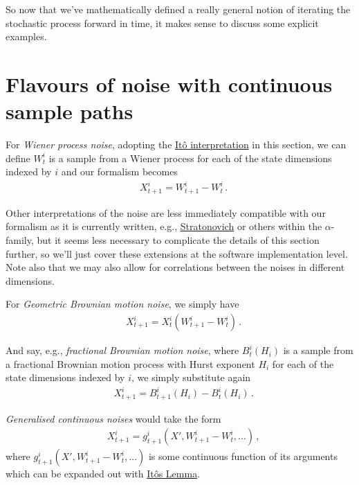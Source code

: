 \documentclass{book}
\begin{document}
So now that we've mathematically defined a really general notion of iterating the stochastic process forward in time, it makes sense to discuss some explicit examples.


\section{\sffamily Flavours of noise with continuous sample paths}

For \emph{Wiener process noise}, adopting the \href{https://en.wikipedia.org/wiki/It\%C3\%B4_calculus}{Itô interpretation} in this section, we can define $W^i_{t}$ is a sample from a Wiener process for each of the state dimensions indexed by $i$ and our formalism becomes
\begin{align}
& X^i_{t+1} = W^i_{t+1}-W^i_{t}\,.
\end{align}

Other interpretations of the noise are less immediately compatible with our formalism as it is currently written, e.g., \href{https://en.wikipedia.org/wiki/Stratonovich_integral}{Stratonovich} or others within the $\alpha$-family, but it seems less necessary to complicate the details of this section further, so we'll just cover these extensions at the software implementation level. Note also that we may also allow for correlations between the noises in different dimensions. 

For \emph{Geometric Brownian motion noise}, we simply have
\begin{align}
& X^i_{t+1} = X^i_{t}(W^i_{t+1}-W^i_{t})\,.
\end{align}

And say, e.g., \emph{fractional Brownian motion noise}, where $B^i_{t}({H_i})$ is a sample from a fractional Brownian motion process with Hurst exponent $H_i$ for each of the state dimensions indexed by $i$, we simply substitute again
\begin{align}
& X^i_{t+1} = B^i_{t+1}({H_i})-B^i_{t}({H_i})\,.
\end{align}

\emph{Generalised continuous noises} would take the form
\begin{align}
& X^i_{t+1} = g^i_{t+1}(X', W^i_{t+1}-W^i_t, \dots) \,,
\end{align}
where $g^i_{t+1}(X', W^i_{t+1}-W^i_t, \dots)$ is some continuous function of its arguments which can be expanded out with \href{https://en.wikipedia.org/wiki/It\%C3\%B4\%27s_lemma}{Itôs Lemma}.
\end{document}
